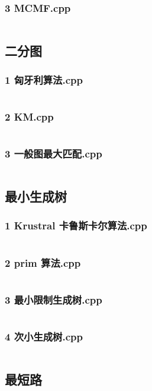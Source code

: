 \documentclass[a4paper,11pt]{article}
\begin{document}
\subsubsection{3 MCMF.cpp}
\inputminted{c++}{"D:/tmplz/templates/图论/Maxflow/3 MCMF.cpp"}
\subsection{二分图}
\subsubsection{1 匈牙利算法.cpp}
\inputminted{c++}{"D:/tmplz/templates/图论/二分图/1 匈牙利算法.cpp"}
\subsubsection{2 KM.cpp}
\inputminted{c++}{"D:/tmplz/templates/图论/二分图/2 KM.cpp"}
\subsubsection{3 一般图最大匹配.cpp}
\inputminted{c++}{"D:/tmplz/templates/图论/二分图/3 一般图最大匹配.cpp"}
\subsection{最小生成树}
\subsubsection{1 Krustral 卡鲁斯卡尔算法.cpp}
\inputminted{c++}{"D:/tmplz/templates/图论/最小生成树/1 Krustral 卡鲁斯卡尔算法.cpp"}
\subsubsection{2 prim 算法.cpp}
\inputminted{c++}{"D:/tmplz/templates/图论/最小生成树/2 prim 算法.cpp"}
\subsubsection{3 最小限制生成树.cpp}
\inputminted{c++}{"D:/tmplz/templates/图论/最小生成树/3 最小限制生成树.cpp"}
\subsubsection{4 次小生成树.cpp}
\inputminted{c++}{"D:/tmplz/templates/图论/最小生成树/4 次小生成树.cpp"}
\subsection{最短路}
\end{document}
